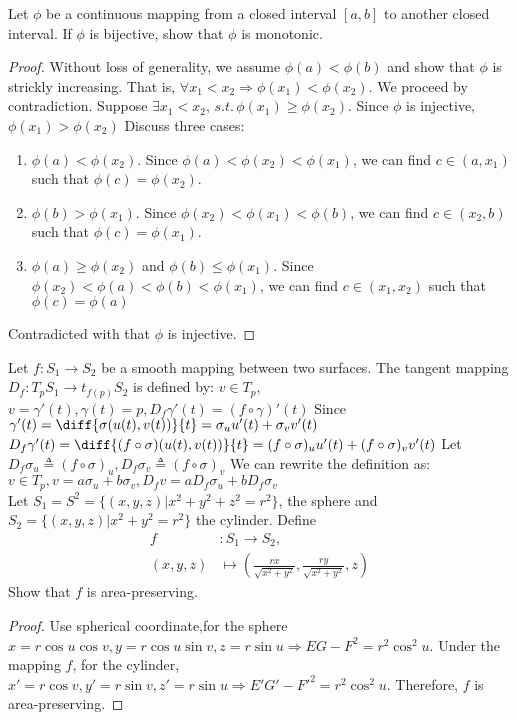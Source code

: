 \documentclass{article}
\begin{document}
Let $\phi$ be a continuous mapping from a closed interval $[a,b]$ to another closed interval. If $\phi$ is bijective, show that $\phi$ is monotonic.
\begin{proof}
Without loss of generality, we assume $\phi(a)<\phi(b)$ and show that $\phi$ is strickly increasing. That is, $\forall x_1<x_2\Rightarrow \phi(x_1)<\phi(x_2)$. We proceed by contradiction. Suppose $\exists x_1<x_2,\, s.t. \, \phi(x_1)\geq \phi(x_2)$. Since $\phi$ is injective, $\phi(x_1)>\phi(x_2)$ Discuss three cases:
\begin{enumerate}
\item $\phi(a)<\phi(x_2)$. Since $\phi(a)<\phi(x_2)<\phi(x_1)$, we can find $c\in (a,x_1)$ such that $\phi(c) = \phi(x_2)$.
\item $\phi(b)>\phi(x_1)$. Since $\phi(x_2)<\phi(x_1)<\phi(b)$, we can find $c\in (x_2,b)$ such that $\phi(c) = \phi(x_1)$.
\item $\phi(a)\geq \phi(x_2)$ and $\phi(b)\leq \phi(x_1)$. Since $\phi(x_2) < \phi(a) <\phi(b)<\phi(x_1)$, we can find $c\in (x_1,x_2)$ such that 
$\phi(c) = \phi(a)$
\end{enumerate} 
Contradicted with that $\phi$ is injective.
\end{proof}
Let $f:S_1\to S_2$ be a smooth mapping between two surfaces.
The tangent mapping $D_f: T_p S_1 \to t_{f(p)} S_2$ is defined  by:
$v \in T_p$, $v=\gamma'(t),\gamma(t)=p,D_f\gamma'(t) =(f\circ \gamma)'(t)$
Since $\gamma'(t)=\diff{\sigma(u(t),v(t))}{t}=\sigma_u u'(t)+\sigma_v v'(t)$
$D_f\gamma'(t)=\diff{(f\circ \sigma)(u(t),v(t))}{t}=(f\circ \sigma)_u u'(t) + (f\circ \sigma)_v v'(t)$
Let $D_f \sigma_u \triangleq (f\circ \sigma)_u,D_f \sigma_v \triangleq (f\circ \sigma)_v$
We can rewrite the definition as:
$v\in T_p,v=a \sigma_u + b \sigma_v,D_f v =a D_f \sigma_u + b D_f \sigma_v$
\quad\\

Let $S_1 = S^2 =\{(x,y,z)| x^2 + y^2 +z^2 = r^2\}$, the sphere and $S_2 = \{(x,y,z)| x^2 + y^2 = r^2\}$ the cylinder. Define
\begin{align*}
f & : S_1 \to S_2,\\
(x,y,z) & \longmapsto \left( \frac{rx}{\sqrt{x^2 + y^2}}, \frac{ry}{\sqrt{x^2+y^2}},z \right)
\end{align*}
Show that $f$ is area-preserving.
\begin{proof}
Use spherical coordinate,for the sphere $x = r\cos u \cos v, y = r\cos u \sin v, z = r\sin u \Rightarrow EG-F^2 = r^2\cos^2 u$.
Under the mapping $f$, for the cylinder, $x' = r\cos v, y' = r\sin v, z' = r\sin u \Rightarrow E'G'-F'^2 = r^2\cos^2 u$.
Therefore, $f$ is area-preserving.   
\end{proof}
\end{document}
